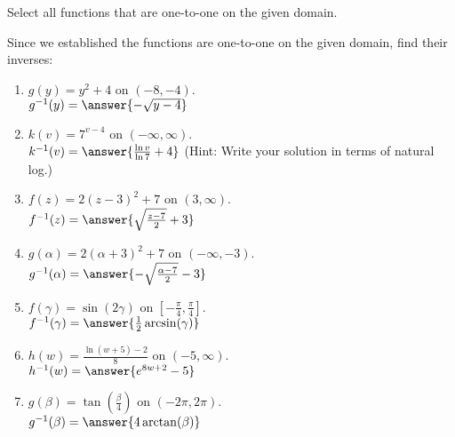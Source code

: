 \documentclass{ximera}
\author{Elizabeth Campolongo}
\begin{document}
\begin{exercise}
Select all functions that are one-to-one on the given domain.
%
\begin{selectAll}
\end{selectAll}

\begin{exercise}
Since we established the functions are one-to-one on the given domain, find their inverses:
\begin{enumerate}

\item $g(y) = y^2+4$ on $(-8,-4)$.\\
$g^{-1}(y) = \answer{-\sqrt{y-4}}$

\item $k(v) = 7^{v-4}$ on $(-\infty, \infty)$.\\
$k^{-1}(v) = \answer{\frac{\ln v}{\ln7} +4}$ (Hint: Write your solution in terms of natural log.)

\item $f(z) = 2(z-3)^2+7$ on $(3, \infty)$.\\
$f^{-1}(z) = \answer{\sqrt{\frac{z-7}{2}}+3}$

\item $g(\alpha) = 2(\alpha+3)^2+7$ on $(-\infty, -3)$.\\
$g^{-1}(\alpha) = \answer{-\sqrt{\frac{\alpha-7}{2}}-3}$

\item $f(\gamma) = \sin(2\gamma)$ on $\left[-\frac{\pi}{4}, \frac{\pi}{4} \right]$. \\
$f^{-1}(\gamma) = \answer{\frac{1}{2}\arcsin(\gamma)}$

\item $h(w) = \frac{\ln(w+5) - 2}{8}$ on $(-5,\infty)$. \\
$h^{-1}(w) = \answer{e^{8w+2}-5}$

\item $g(\beta)= \tan\left(\frac{\beta}{4}\right)$ on $(-2\pi,2\pi)$.\\
$g^{-1}(\beta) = \answer{4\arctan(\beta)}$

\end{enumerate}
\end{exercise}



\end{exercise}
\end{document}
